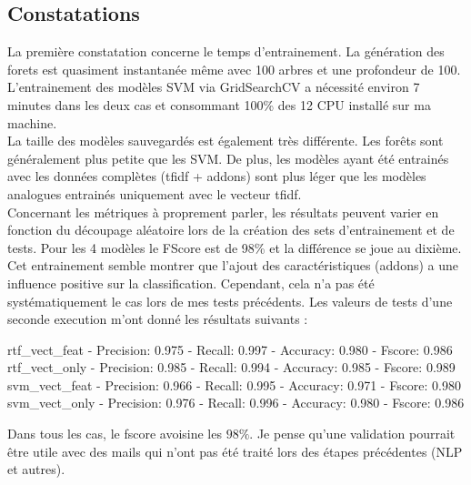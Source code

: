 \subsection*{Constatations}
    La première constatation concerne le temps d'entrainement.
    La génération des forets est quasiment instantanée même avec 100 arbres et une profondeur de 100.
    L'entrainement des modèles SVM via GridSearchCV a nécessité environ 7 minutes dans les deux cas et consommant 100\% des 12 CPU installé sur ma machine.\\

    La taille des modèles sauvegardés est également très différente.
    Les forêts sont généralement plus petite que les SVM\@.
    De plus, les modèles ayant été entrainés avec les données complètes (tfidf + addons) sont plus léger que les modèles analogues entrainés uniquement avec le vecteur tfidf.\\

    Concernant les métriques à proprement parler, les résultats peuvent varier en fonction du découpage aléatoire lors de la création des sets d'entrainement et de tests.
    Pour les 4 modèles le FScore est de 98\% et la différence se joue au dixième.
    Cet entrainement semble montrer que l'ajout des caractéristiques (addons) a une influence positive sur la classification.
    Cependant, cela n'a pas été systématiquement le cas lors de mes tests précédents.
    Les valeurs de tests d'une seconde execution m'ont donné les résultats suivants :
\begin{verbatimtab}
rtf_vect_feat - Precision: 0.975 - Recall: 0.997 - Accuracy: 0.980 - Fscore: 0.986
rtf_vect_only - Precision: 0.985 - Recall: 0.994 - Accuracy: 0.985 - Fscore: 0.989
svm_vect_feat - Precision: 0.966 - Recall: 0.995 - Accuracy: 0.971 - Fscore: 0.980
svm_vect_only - Precision: 0.976 - Recall: 0.996 - Accuracy: 0.980 - Fscore: 0.986
\end{verbatimtab}

    Dans tous les cas, le fscore avoisine les $98\%$.
    Je pense qu'une validation pourrait être utile avec des mails qui n'ont pas été traité lors des étapes précédentes (NLP et autres).
